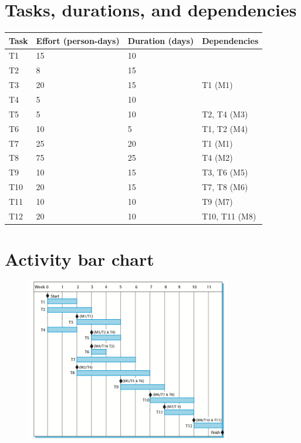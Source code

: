 \section{Tasks, durations, and dependencies}
\begin{table}[h!]
\centering
\begin{tabular}{ |p{2cm}|p{2cm}|p{2cm}|p{3cm}|  }
\hline
Task & Effort (person-days) & Duration (days) &  Dependencies\\
\hline
\hline
T1 & 15 & 10 & \\
\hline
T2 & 8 & 15 & \\
\hline
T3 & 20 & 15 & T1 (M1)\\
\hline
T4 & 5 & 10 & \\
\hline
T5 & 5 & 10 & T2, T4 (M3)\\
\hline
T6 & 10 & 5 & T1, T2 (M4)\\
\hline
T7 & 25 & 20 & T1 (M1)\\
\hline
T8 & 75 & 25 & T4 (M2)\\
\hline
T9 & 10 & 15 & T3, T6 (M5)\\
\hline
T10 & 20 & 15 & T7, T8 (M6)\\
\hline
T11 & 10 & 10 & T9 (M7)\\
\hline
T12 & 20 & 10 & T10, T11 (M8)\\
\hline
\end{tabular}

\label{table:T6_2}
\end{table}



\newpage
\section{Activity bar chart}
\begin{figure}[h!]
    \centering
    \includegraphics[width = 0.8\textwidth]{./figures/L6_3.png}
    \caption{}
    \label{fig:L6_3}
\end{figure}

